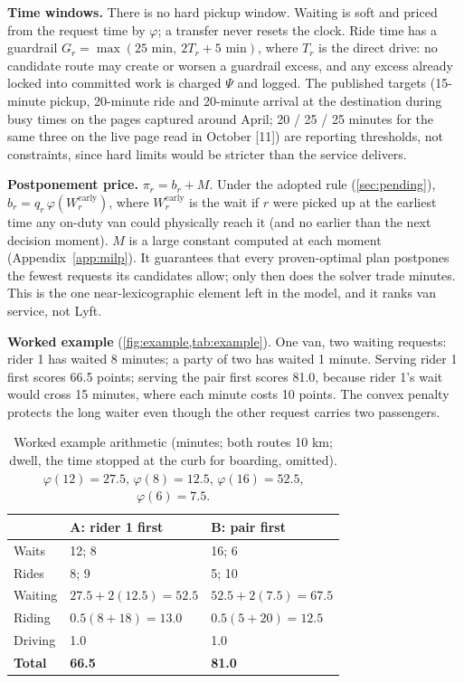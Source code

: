 \documentclass{article}
\begin{document}
\textbf{Time windows.} There is no hard pickup window. Waiting is soft and priced from the request time by $\varphi$; a transfer never resets the clock. Ride time has a guardrail $G_r = \max(25\text{ min},\ 2T_r + 5\text{ min})$, where $T_r$ is the direct drive: no candidate route may create or worsen a guardrail excess, and any excess already locked into committed work is charged $\Psi$ and logged. The published targets (15-minute pickup, 20-minute ride and 20-minute arrival at the destination during busy times on the pages captured around April; 20 / 25 / 25 minutes for the same three on the live page read in October [11]) are reporting thresholds, not constraints, since hard limits would be stricter than the service delivers.

\textbf{Postponement price.} $\pi_r = b_r + M$. Under the adopted rule (\cref{sec:pending}), $b_r = q_r\,\varphi(W_r^{\mathrm{early}})$, where $W_r^{\mathrm{early}}$ is the wait if $r$ were picked up at the earliest time any on-duty van could physically reach it (and no earlier than the next decision moment). $M$ is a large constant computed at each moment (Appendix~\ref{app:milp}). It guarantees that every proven-optimal plan postpones the fewest requests its candidates allow; only then does the solver trade minutes. This is the one near-lexicographic element left in the model, and it ranks van service, not Lyft.

\textbf{Worked example} (\cref{fig:example,tab:example}). One van, two waiting requests: rider 1 has waited 8 minutes; a party of two has waited 1 minute. Serving rider 1 first scores 66.5 points; serving the pair first scores 81.0, because rider 1's wait would cross 15 minutes, where each minute costs 10 points. The convex penalty protects the long waiter even though the other request carries two passengers.



\begin{table}[t]
\centering\small
\caption{Worked example arithmetic (minutes; both routes 10 km; dwell, the time stopped at the curb for boarding, omitted). $\varphi(12)=27.5$, $\varphi(8)=12.5$, $\varphi(16)=52.5$, $\varphi(6)=7.5$.}\label{tab:example}
\begin{tabularx}{\columnwidth}{@{}P{1.35cm}LL@{}}
\toprule
 & \textbf{A: rider 1 first} & \textbf{B: pair first}\\
\midrule
Waits & 12; 8 & 16; 6\\
Rides & 8; 9 & 5; 10\\
Waiting & $27.5 + 2(12.5) = 52.5$ & $52.5 + 2(7.5) = 67.5$\\
Riding & $0.5(8 + 18) = 13.0$ & $0.5(5 + 20) = 12.5$\\
Driving & 1.0 & 1.0\\
\midrule
\textbf{Total} & \textbf{66.5} & \textbf{81.0}\\
\bottomrule
\end{tabularx}
\end{table}
\end{document}
